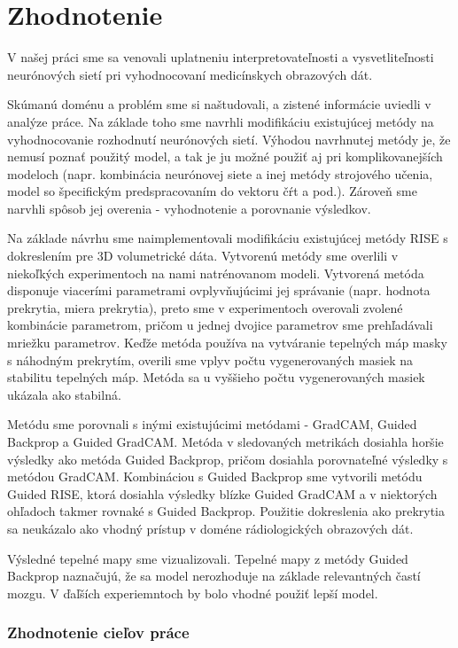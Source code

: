 \chapter{Zhodnotenie}

V našej práci sme sa venovali uplatneniu interpretovateľnosti a vysvetliteľnosti neurónových sietí pri vyhodnocovaní medicínskych obrazových dát. 

Skúmanú doménu a problém sme si naštudovali, a zistené informácie uviedli v analýze práce. Na základe toho sme navrhli modifikáciu existujúcej metódy na vyhodnocovanie rozhodnutí neurónových sietí. Výhodou navrhnutej metódy je, že nemusí poznať použitý model, a tak je ju možné použiť aj pri komplikovanejších modeloch (napr. kombinácia neurónovej siete a inej metódy strojového učenia, model so špecifickým predspracovaním do vektoru čŕt a pod.). Zároveň sme narvhli spôsob jej overenia - vyhodnotenie a porovnanie výsledkov.

Na základe návrhu sme naimplementovali modifikáciu existujúcej metódy RISE s dokreslením pre 3D volumetrické dáta. Vytvorenú metódy sme overlili v niekoľkých experimentoch na nami natrénovanom modeli. Vytvorená metóda disponuje viacerími parametrami ovplyvňujúcimi jej správanie (napr. hodnota prekrytia, miera prekrytia), preto sme v experimentoch overovali zvolené kombinácie parametrom, pričom u jednej dvojice parametrov sme prehľadávali mriežku parametrov. Keďže metóda používa na vytváranie tepelných máp masky s náhodným prekrytím, overili sme vplyv počtu vygenerovaných masiek na stabilitu tepelných máp. Metóda sa u vyššieho počtu vygenerovaných masiek ukázala ako stabilná.

Metódu sme porovnali s inými existujúcimi metódami - GradCAM, Guided Backprop a Guided GradCAM. Metóda v sledovaných metrikách dosiahla horšie výsledky ako metóda Guided Backprop, pričom dosiahla porovnateľné výsledky s metódou GradCAM. Kombináciou s Guided Backprop sme vytvorili metódu Guided RISE, ktorá dosiahla výsledky blízke Guided GradCAM a v niektorých ohľadoch takmer rovnaké s Guided Backprop. Použitie dokreslenia ako prekrytia sa neukázalo ako vhodný prístup v doméne rádiologických obrazových dát. 

Výsledné tepelné mapy sme vizualizovali. Tepelné mapy z metódy Guided Backprop naznačujú, že sa model nerozhoduje na základe relevantných častí mozgu. V ďaľších experiemntoch by bolo vhodné použiť lepší model.

\subsection{Zhodnotenie cieľov práce}

